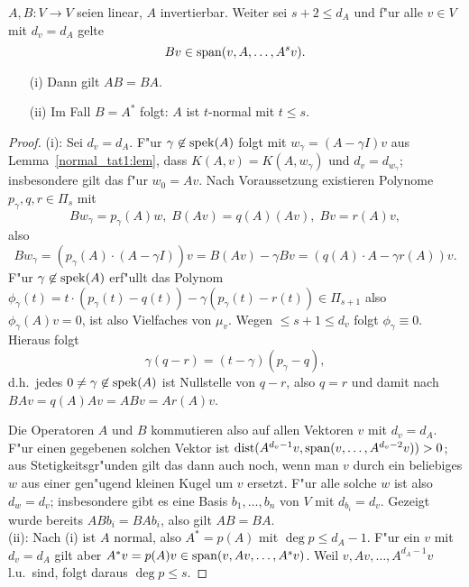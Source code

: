 \begin{lem} \label{FMproof1:lem}
$A,B: V \to V$ seien linear, $A$ invertierbar. Weiter sei $s+2 \leq d_A$ und 
f"ur alle $v \in V$ mit $d_v = d_A$  gelte
\[
Bv \in \operatorname{span}(v,A,\ldots,A^s v).
\]
\begin{itemize}
\item[(i)] Dann gilt $AB = BA$.
\item[(ii)] Im Fall $B = A^*$ folgt: $A$ ist $t$-normal mit $t \leq s$.
\end{itemize} 
\end{lem}
\begin{proof}
(i): Sei $d_v = d_A$. F"ur $\gamma \not \in \operatorname{spek}(A)$ folgt mit $w_\gamma = (A-\gamma I)v$
aus Lemma~\ref{normal_tat1:lem}, dass $K(A,v) = K(A,w_\gamma)$ und $d_v = d_{w_\gamma}$; insbesondere gilt das f"ur $w_0 = Av$. Nach Voraussetzung existieren Polynome $p_\gamma,
q,r \in \Pi_s$ mit
\begin{equation} \label{BAs:eq}
   Bw_\gamma = p_\gamma(A)w, \; B(Av) = q(A)(Av), \; Bv = r(A)v,
\end{equation}
also
\[
Bw_\gamma = (p_\gamma(A)\cdot(A -\gamma I))v = B(Av)-\gamma Bv = (q(A)\cdot A - \gamma r(A))v. 
\]
F"ur $\gamma \not \in \operatorname{spek}(A)$ erf"ullt das Polynom $\phi_\gamma(t) = t\cdot(p_\gamma(t)-q(t))-\gamma(p_\gamma(t)-r(t)) \in \Pi_{s+1}$ 
also $\phi_\gamma(A)v = 0$, ist also Vielfaches von $\mu_v$. Wegen $\leq s+1 \leq d_v$
folgt $\phi_\gamma \equiv 0$. Hieraus folgt 
\[
   \gamma(q-r) = (t-\gamma)(p_\gamma - q),
\]
d.h.\ jedes $0 \neq \gamma \not \in \operatorname{spek}(A)$ ist Nullstelle von $q-r$,
also $q=r$ und damit nach  $BAv = q(A)Av = ABv = Ar(A)v$. 

Die Operatoren
$A$ und $B$  kommutieren also auf allen Vektoren $v$ mit $d_v = d_A$. F"ur einen gegebenen solchen Vektor
ist $\mbox{dist}(A^{d_v-1}v,\operatorname{span}(v,\ldots,A^{d_v-2}v)) >0$; aus Stetigkeitsgr"unden 
gilt das dann auch noch, wenn man $v$ durch ein beliebiges $w$ aus einer gen"ugend kleinen 
Kugel um $v$ ersetzt. F"ur alle solche $w$ ist also $d_w = d_v$; insbesondere gibt
es eine Basis $b_1,\ldots,b_n$ von $V$ mit $d_{b_i} = d_v$. Gezeigt wurde bereits
$ABb_i = BAb_i$, also gilt $AB = BA$. \smallskip \\
(ii): Nach (i) ist $A$ normal, also $A^* = p(A)$ mit $\deg p \leq d_A-1$. F"ur ein $v$ mit 
$d_v = d_A$ gilt aber $A^*v = p(A)v \in \operatorname{span}(v,Av,\ldots,A^sv)$. Weil $v,Av,\ldots,A^{d_A-1}v$
l.u.\ sind, folgt daraus $\deg p \leq s$.
\end{proof}
\medskip

